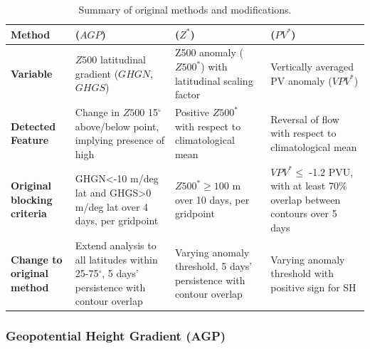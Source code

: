 \documentclass[smallextended]{svjour3}       %
\numberwithin{equation}{section}
\begin{document}
\begin{table}
\caption{Summary of original methods and modifications.} %
\label{tabsum}
\begin{tabular}{|L{0.12\textwidth}|L{0.22\textwidth}|L{0.22\textwidth}|L{0.22\textwidth}|}
\hline
\textbf{Method} &  \textbf{\citealt{tibaldi_operational_1990} ($AGP$)}  & \textbf{\citealt{dole_persistent_1983} ($Z^*$)}  &
\textbf{\citealt{schwierz_perspicacious_2004} ($PV^*$)}  \\ \hline
\textbf{Variable} &  $Z500$ latitudinal gradient ($GHGN$, $GHGS$) &
Z500 anomaly ($Z500^*$) with latitudinal scaling factor 
& Vertically averaged PV anomaly ($VPV^*$) \\ \hline
\textbf{Detected Feature}  & Change in $Z500$ 15$^\circ$ above/below point, implying presence of high  
& Positive $Z500^*$ with respect to climatological mean 
& Reversal of flow with respect to climatological mean\\ \hline
\textbf{Original blocking criteria}   & GHGN\textless-10 m/deg lat and GHGS\textgreater0 m/deg lat over 4 days, per gridpoint  
& $Z500^*\geq 100$ m over 10 days, per gridpoint                        
& $VPV^*\leq$ -1.2 PVU, with at least 70\% overlap between contours over 5 days \\ \hline
\textbf{Change to original method}   & Extend analysis to all latitudes within 25-75$^{\circ}$, 5 days' persistence with contour overlap
& Varying anomaly threshold, 5 days' persistence with contour overlap
& Varying anomaly threshold with positive sign for SH \\ \hline
\end{tabular}
\end{table}

\subsubsection{Geopotential Height Gradient (AGP)}\label{ghgdef}
\end{document}
